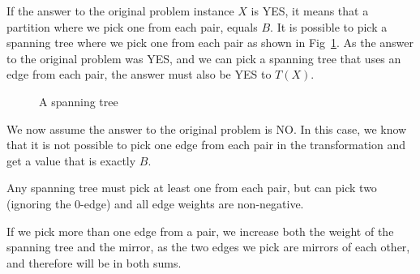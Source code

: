 If the answer to the original problem instance $X$ is YES, it means that a partition where we pick one from each pair, equals $B$. It is possible to pick a spanning tree where we pick one from each pair as shown in Fig~\ref{fig:transform3}. As the answer to the original problem was YES, and we can pick a spanning tree that uses an edge from each pair, the answer must also be YES to $T(X)$.

\begin{figure}[htb]
\caption{A spanning tree}
\label{fig:transform3}
\end{figure}

We now assume the answer to the original problem is NO. In this case, we know that it is not possible to pick one edge from each pair in the transformation and get a value that is exactly $B$. 

Any spanning tree must pick at least one from each pair, but can pick two (ignoring the $0$-edge) and all edge weights are non-negative. 

If we pick more than one edge from a pair, we increase both the weight of the spanning tree and the mirror, as the two edges we pick are mirrors of each other, and therefore will be in both sums.

